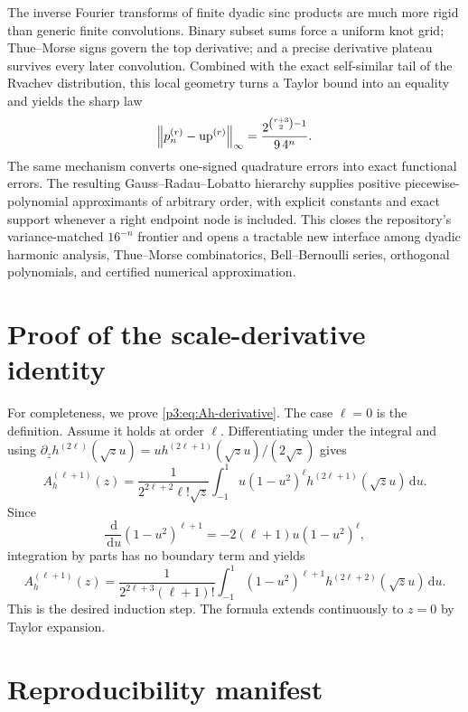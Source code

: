 \documentclass[11pt,oneside]{article}
\numberwithin{equation}{section}
\theoremstyle{definition}
\theoremstyle{remark}
\newcommand{\Up}{\operatorname{up}}
\newcommand{\dd}{\,\mathrm d}
\begin{document}
The inverse Fourier transforms of finite dyadic sinc products are much more rigid than
generic finite convolutions.  Binary subset sums force a uniform knot grid; Thue--Morse
signs govern the top derivative; and a precise derivative plateau survives every later
convolution.  Combined with the exact self-similar tail of the Rvachev distribution,
this local geometry turns a Taylor bound into an equality and yields the sharp law
\[
 \norm{p_n^{(r)}-\Up^{(r)}}_\infty
 =\frac{2^{\binom{r+3}{2}-1}}{9\,4^n}.
\]
The same mechanism converts one-signed quadrature errors into exact functional errors.
The resulting Gauss--Radau--Lobatto hierarchy supplies positive piecewise-polynomial
approximants of arbitrary order, with explicit constants and exact support whenever a
right endpoint node is included.  This closes the repository's variance-matched
$16^{-n}$ frontier and opens a tractable new interface among dyadic harmonic analysis,
Thue--Morse combinatorics, Bell--Bernoulli series, orthogonal polynomials, and certified
numerical approximation.

\appendix

\section{Proof of the scale-derivative identity}
\label{p3:app:Ah}

For completeness, we prove \cref{p3:eq:Ah-derivative}.  The case $\ell=0$ is the
definition.  Assume it holds at order $\ell$.  Differentiating under the integral and
using $\partial_z h^{(2\ell)}(\sqrt z u)
=u h^{(2\ell+1)}(\sqrt z u)/(2\sqrt z)$ gives
\[
 A_h^{(\ell+1)}(z)
 =\frac{1}{2^{2\ell+2}\ell!\sqrt z}
 \int_{-1}^{1}u(1-u^2)^\ell h^{(2\ell+1)}(\sqrt z u)\dd u.
\]
Since
\[
 \frac{\dd}{\dd u}(1-u^2)^{\ell+1}
 =-2(\ell+1)u(1-u^2)^\ell,
\]
integration by parts has no boundary term and yields
\[
 A_h^{(\ell+1)}(z)
 =\frac{1}{2^{2\ell+3}(\ell+1)!}
 \int_{-1}^{1}(1-u^2)^{\ell+1}h^{(2\ell+2)}(\sqrt z u)\dd u.
\]
This is the desired induction step.  The formula extends continuously to $z=0$ by
Taylor expansion.

\section{Reproducibility manifest}
\label{p3:app:manifest}
\end{document}
